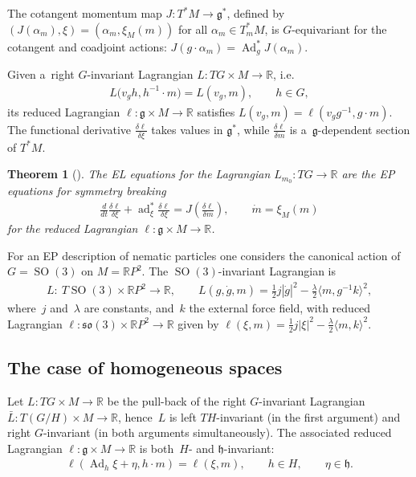 \documentclass[10pt,a4paper]{amsart}
\numberwithin{equation}{section}
\newtheorem{Theorem}{Theorem}[section]
\begin{document}
The cotangent momentum map $J:T^*M\to \mathfrak g^*$, def\/ined by $(J(\alpha_m),\xi)=(\alpha_m,\xi_M(m))$ for all
$\alpha_m\in T^*_mM$, is $G$-equivariant for the cotangent and coadjoint actions:
$J(g\cdot\alpha_m)=\operatorname{Ad}^*_gJ(\alpha_m)$.

Given a~right $G$-invariant Lagrangian $L:TG\times M\rightarrow\mathbb{R}$, i.e.\
\begin{gather*}
L\big(v_gh,h^{-1}\cdot m\big)=L(v_g,m),
\qquad
h\in G,
\end{gather*}
its reduced Lagrangian {$\ell:\mathfrak{g}\times M\rightarrow\mathbb{R}$} satisf\/ies $L(v_g,m)=\ell(v_gg^{-1},g\cdot m)$.
The functional derivative $\frac{\delta\ell}{\delta\xi}$ takes values in $\mathfrak g^*$, while
$\frac{\delta\ell}{\delta m}$ is a~$\mathfrak g$-dependent section of $T^*M$.

\begin{Theorem}[\cite{GBT}]
The EL equations for the Lagrangian $L_{m_0}:TG\to\mathbb R$ are the EP equations for symmetry breaking
\begin{gather}
\label{epbreak}
{\frac{d}{dt}\frac{\delta\ell}{\delta\xi}+\operatorname{ad}^*_\xi\frac{\delta
\ell}{\delta\xi}=J\left(\frac{\delta\ell}{\delta m}\right)},
\qquad
\dot{m}=\xi_M(m)
\end{gather}
for the reduced Lagrangian $\ell:\mathfrak g\times M\to\mathbb R$.
\end{Theorem}

\begin{Example}
\label{nema}
For an EP description of nematic particles one considers the canonical action of $G=\operatorname{SO}(3)$ on $M=\mathbb
R P^2$.
The $\operatorname{SO}(3)$-invariant Lagrangian is
\begin{gather*}
L: \ T\operatorname{SO}(3)\times\mathbb R P^2\to\mathbb R,
\qquad
L(g,\dot g,m)=\frac12 j|\dot g|^2- \frac{\lambda}{2}\big\langle m, g^{-1}k\big\rangle^2,
\end{gather*}
where~$j$ and~$\lambda$ are constants, and~$k$ the external force f\/ield, with reduced Lagrangian
$\ell:\mathfrak{so}(3)\times\mathbb R P^2\to\mathbb R$ given by $\ell(\xi,m)=\frac12 j|\xi|^2-\frac{\lambda}{2}\langle
m, k\rangle^2$.
\end{Example}

\subsection{The case of homogeneous spaces}

Let $L:TG\times M\to\mathbb R$ be the pull-back of the right $G$-invariant Lagrangian $\bar L:T(G/H)\times M\to\mathbb
R$, hence~$L$ is left $TH$-invariant (in the f\/irst argument) and right $G$-invariant (in both arguments simultaneously).
The associated reduced Lagrangian $\ell:\mathfrak g\times M\to\mathbb R$ is both~$H$- and $\mathfrak h$-invariant:
\begin{gather}
\label{invinvinv}
\ell(\operatorname{Ad}_h\xi+\eta,h\cdot m)=\ell(\xi,m),
\qquad
h\in H,
\qquad
\eta\in\mathfrak h.
\end{gather}
\end{document}
